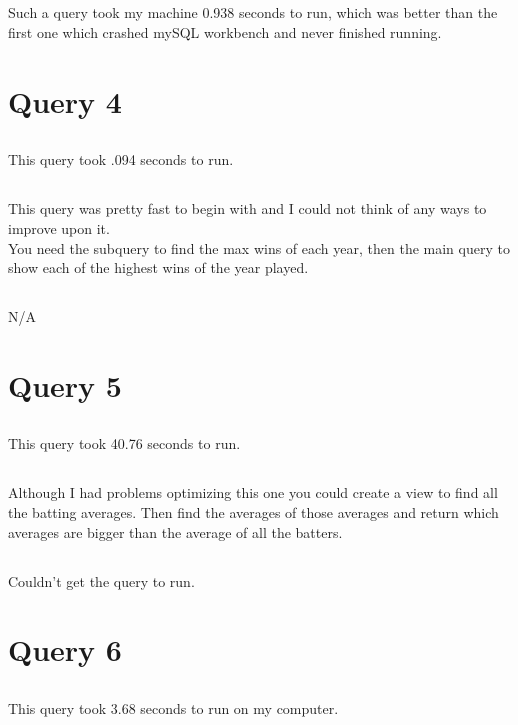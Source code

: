 \documentclass[11pt]{article}
\theoremstyle{plain}
\theoremstyle{definition}
\begin{document}
\subsection{}
Such a query took my machine 0.938 seconds to run, which was better than the first one which crashed mySQL workbench and never finished running.
\clearpage
\section{Query 4}
\subsection{}This query took .094 seconds to run.
\subsection{}This query was pretty fast to begin with and I could not think of any ways to improve upon it.\\
You need the subquery to find the max wins of each year, then the main query to show each of the highest wins of the year played.
\subsection{} N/A

\section{Query 5}
\subsection{} This query took 40.76 seconds to run.
\subsection{}Although I had problems optimizing this one you could create a view to find all the batting averages. Then find the averages of those averages and return which averages are bigger than the average of all the batters.
\subsection{} Couldn't get the query to run.

\section{Query 6}
\subsection{}
This query took 3.68 seconds to run on my computer.
\end{document}
